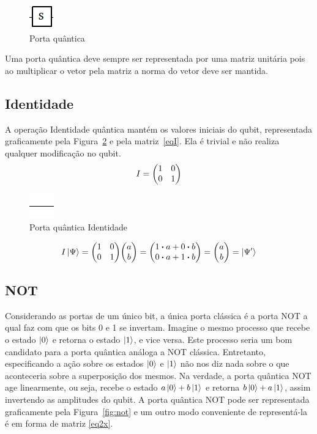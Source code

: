 \documentclass[a4paper, 12pt, oneside]{book}
\begin{document}
\begin{figure}[H]
\centering
\includegraphics[scale=0.75]{s.jpg}
\caption{Porta quântica}
\label{fig:portaQuantica}
\end{figure}

Uma porta quântica deve sempre ser representada por uma matriz unitária pois ao multiplicar o vetor pela matriz a norma do vetor deve ser mantida.

\subsection{Identidade} \label{sec:identidade}
A operação Identidade quântica mantém os valores iniciais do qubit, representada graficamente pela Figura~\ref{fig:I} e pela matriz~\eqref{eqI}. Ela é trivial e não realiza qualquer modificação no qubit.
\begin{equation}\label{eqI}
I =  \mqty(1&0\\0&1)
\end{equation}

\begin{figure}[H]
\centering
\includegraphics[scale=0.75]{line.jpg}
\caption{Porta quântica Identidade}
\label{fig:I}
\end{figure}

\begin{align*}
I\ket{\Psi} = \mqty(1&0\\0&1)\mqty(a\\b) = \mqty(1 \vdot a+0 \vdot b \\0 \vdot a+1 \vdot b) = \mqty(a\\b) = \ket{\Psi'}
\end{align*}

\subsection{NOT} 
Considerando as portas de um único bit, a única porta clássica é a porta NOT a qual faz com que os bits 0 e 1 se invertam. Imagine o mesmo processo que recebe o estado $\ket{0}$ e retorna o estado $\ket{1}$, e vice versa. Este processo seria um bom candidato para a porta quântica análoga a NOT clássica. Entretanto, especificando a ação sobre os estados $\ket{0}$ e $\ket{1}$ não nos diz nada sobre o que aconteceria sobre a superposição dos mesmos. Na verdade, a porta quântica NOT age linearmente, ou seja, recebe o estado $a\ket{0} + b\ket{1}$ e retorna $b\ket{0} + a\ket{1}$, assim invertendo as amplitudes do qubit. A porta quântica NOT pode ser representada graficamente pela Figura~\ref{fig:not} e um outro modo conveniente de representá-la é em forma de matriz \eqref{eq2x}.
\end{document}
